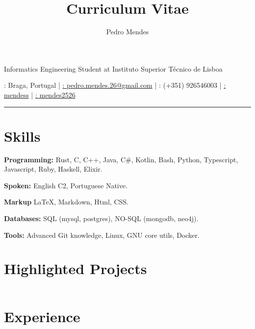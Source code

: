 \documentclass{article}
\makeatletter
\renewcommand{\maketitle}
{
        \begin{center}
            {\huge\bfseries\theauthor}

            \vspace{.25em}

            \Large{Informatics Engineering Student at Instituto Superior Técnico
            de Lisboa}

            \vspace{.25em}

            \large{\thetitle}

            \vspace{.25em}

            \faMapMarker: Braga, Portugal |
            \href{mailto:pedro.mendes.26@gmail.com}{\faEnvelope:
            pedro.mendes.26@gmail.com} |
            \faPhone: (+351) 926546003 |
            \href{https://github.com/mendess}{\faGithub: mendess} |
            \href{https://www.linkedin.com/in/mendes2526/}{\faLinkedinSquare: mendes2526}

        \end{center}
}
\makeatother
\begin{document}
\title{Curriculum Vitae}
\author{Pedro Mendes}

\maketitle

\hrule

\section{Skills}

\begin{multicols}{2}

    \textbf{Programming:} Rust, C, C++, Java, C\#, Kotlin, Bash, Python,
    Typescript, Javascript, Ruby, Haskell, Elixir.

    \textbf{Spoken:} English C2, Portuguese Native.

    \textbf{Markup} \LaTeX, Markdown, Html, CSS\@.

    \textbf{Databases:} SQL (mysql, postgres), NO-SQL (mongodb, neo4j).

    \textbf{Tools:} Advanced Git knowledge, Linux, GNU core utils, Docker.

\end{multicols}

\section{Highlighted Projects}

\begin{tabular}{p{0.11\linewidth}p{0.73\linewidth}l}
\end{tabular}

\section{Experience}
\end{document}
